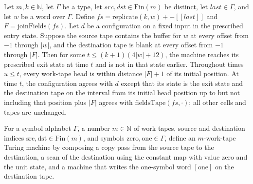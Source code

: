 \begin{theorem}
\label{Turing.rt_tail_run}
\leanok
{}
Let $m,k\in\mathbb{N}$, let $\Gamma$ be a type, let $src,dst\in\mathrm{Fin}(m)$ be
distinct, let $last\in\Gamma$, and let $w$ be a word over $\Gamma$. Define
$fs=\mathrm{replicate}(k,w)++[[last]]$ and $F=\mathrm{joinFields}(fs)$. Let $d$ be a configuration
on a fixed input in the prescribed entry state. Suppose the source tape contains the
buffer for $w$ at every offset from $-1$ through $|w|$, and the destination tape is blank
at every offset from $-1$ through $|F|$. Then for some $t\le(k+1)(4|w|+12)$, the
machine reaches its prescribed exit state at time $t$ and is not in that state earlier.
Throughout times $u\le t$, every work-tape head is within distance $|F|+1$ of its initial
position. At time $t$, the configuration agrees with $d$ except that its state is the
exit state and the destination tape on the interval from its initial head position up to
but not including that position plus $|F|$ agrees with $\mathrm{fieldsTape}(fs,\cdot)$; all
other cells and tapes are unchanged.
\end{theorem}

\begin{definition}
\label{Turing.rt_positionTM}
\leanok
{}
For a symbol alphabet $\Gamma$, a number $m\in\mathbb N$ of work tapes, source and
destination indices $\mathrm{src},\mathrm{dst}\in\mathrm{Fin}(m)$, and symbols
$\mathrm{zero},\mathrm{one}\in\Gamma$, define an $m$-work-tape Turing machine by
composing a copy pass from the source tape to the destination, a scan of the destination
using the constant map with value $\mathrm{zero}$ and the unit state, and a machine that
writes the one-symbol word $[\mathrm{one}]$ on the destination tape.
\end{definition}

